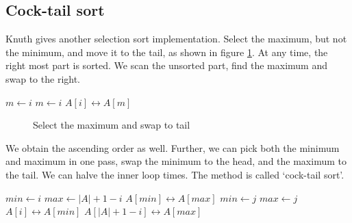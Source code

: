 \documentclass[b5paper]{article}
\begin{document}
\subsection{Cock-tail sort}

Knuth gives another selection sort implementation\cite{TAOCP}. Select the maximum, but not the minimum, and move it to the tail, as shown in figure \ref{fig:knuth-ssort}. At any time, the right most part is sorted. We scan the unsorted part, find the maximum and swap to the right.

\begin{algorithmic}[1]
    \State $m \gets i$
        \State $m \gets i$
      \EndIf
    \EndFor
    \State {} $A[i] \leftrightarrow A[m]$
  \EndFor
\EndProcedure
\end{algorithmic}

\begin{figure}[htbp]
  \centering
  \caption{Select the maximum and swap to tail}
  \label{fig:knuth-ssort}
\end{figure}

We obtain the ascending order as well. Further, we can pick both the minimum and maximum in one pass, swap the minimum to the head, and the maximum to the tail. We can halve the inner loop times. The method is called `cock-tail sort'.

\begin{algorithmic}[1]
    \State $min \gets i$
    \State $max \gets |A| + 1 - i$
      \State {} $A[min] \leftrightarrow A[max]$
    \EndIf
        \State $min \gets j$
      \EndIf
        \State $max \gets j$
      \EndIf
    \EndFor
    \State {} $A[i] \leftrightarrow A[min]$
    \State {} $A[|A|+1-i] \leftrightarrow A[max]$
  \EndFor
\EndProcedure
\end{algorithmic}
\end{document}
